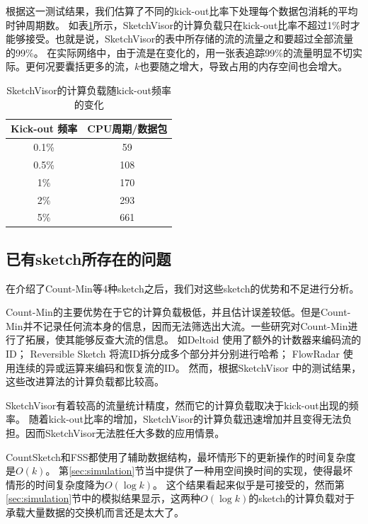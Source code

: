 根据这一测试结果，我们估算了不同的kick-out比率下处理每个数据包消耗的平均时钟周期数。
如表\ref{tbl:sketchvisor}所示，SketchVisor的计算负载只在kick-out比率不超过1\%时才能够接受。也就是说，SketchVisor的表中所存储的流的流量之和要超过全部流量的99\%。
在实际网络中，由于流是在变化的，用一张表追踪99\%的流量明显不切实际。更何况要囊括更多的流，$k$也要随之增大，导致占用的内存空间也会增大。

\begin{table}[h]
	\centering
	\caption{SketchVisor的计算负载随kick-out频率的变化}\label{tbl:sketchvisor}
	\begin{tabular}{c|c}
		\hline
		Kick-out 频率 & CPU周期/数据包 \\
		\hline
		0.1\% & 59 \\
		\hline
		0.5\% & 108 \\
		\hline
		1\% & 170 \\
		\hline
		2\% & 293 \\
		\hline
		5\% & 661 \\
		\hline
	\end{tabular}
\end{table}

\subsection{已有sketch所存在的问题}


在介绍了Count-Min等4种sketch之后，我们对这些sketch的优势和不足进行分析。

Count-Min的主要优势在于它的计算负载极低，并且估计误差较低。但是Count-Min并不记录任何流本身的信息，因而无法筛选出大流。一些研究对Count-Min进行了拓展，使其能够反查大流的信息。
如Deltoid \cite{cormode2005s}使用了额外的计数器来编码流的ID；
Reversible Sketch \cite{schweller2007reversible}将流ID拆分成多个部分并分别进行哈希；
FlowRadar \cite{li2016flowradar}使用连续的异或运算来编码和恢复流的ID。
然而，根据SketchVisor \cite{huang2017sketchvisor}中的测试结果，这些改进算法的计算负载都比较高。

SketchVisor有着较高的流量统计精度，然而它的计算负载取决于kick-out出现的频率。
随着kick-out比率的增加，SketchVisor的计算负载迅速增加并且变得无法负担。因而SketchVisor无法胜任大多数的应用情景。

CountSketch和FSS都使用了辅助数据结构，最坏情形下的更新操作的时间复杂度是$O(k)$。
第\ref{sec:simulation}节当中提供了一种用空间换时间的实现，使得最坏情形的时间复杂度降为$O(\log{k})$。
这个结果看起来似乎是可接受的，然而第\ref{sec:simulation}节中的模拟结果显示，这两种$O(\log{k})$的sketch的计算负载对于承载大量数据的交换机而言还是太大了。

